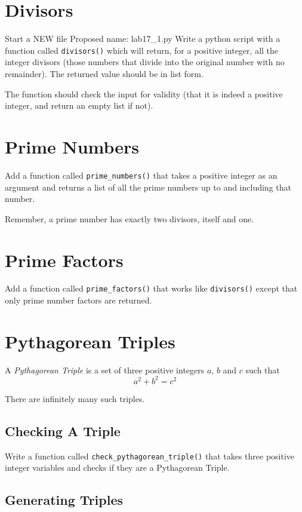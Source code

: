 \documentclass[12pt,oneside]{cttutorial}
\begin{document}
\section{Divisors}

\alert{Start a NEW file}
Proposed name: lab17\_1.py
Write a python script with a function called \lstinline!divisors()! which will return, for a positive integer, all the integer divisors (those numbers that divide into the original number with no remainder). The returned value should be in list form.

The function should check the input for validity (that it is indeed a positive integer, and return an empty list if not).

\section{Prime Numbers}

Add a function called \lstinline!prime_numbers()! that takes a positive integer as an argument and returns a list of all the prime numbers up to and including that number.

Remember, a prime number has exactly two divisors, itself and one.

\section{Prime Factors}

Add a function called \lstinline!prime_factors()! that works like \lstinline!divisors()! except that only prime number factors are returned.

\section{Pythagorean Triples}

A \emph{Pythagorean Triple} is a set of three positive integers $a$, $b$ and $c$ such that
\[
a^2 + b^2 = c^2
\]

There are infinitely many such triples.

\subsection{Checking A Triple}

Write a function called \lstinline!check_pythagorean_triple()! that takes three positive integer variables and checks if they are a Pythagorean Triple.

\subsection{Generating Triples}
\end{document}
